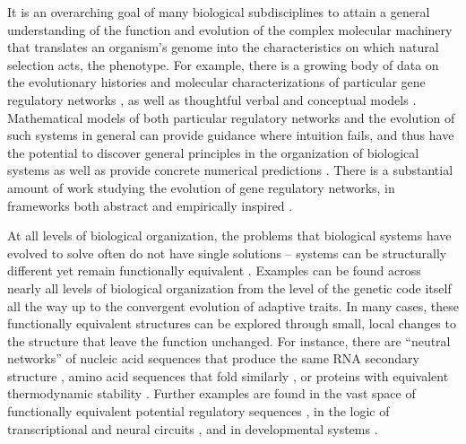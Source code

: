 \documentclass{article}
\newcommand{\plr}[1]{\todo[color=blue!25]{#1}}
\newcommand{\plr}[1]{{\color{blue}\it #1}}
\newcommand{\jss}[1]{{\color{olive}\it #1}}
\newcommand{\1}{\mathbbm{1}}
\begin{document}
It is an overarching goal of many biological subdisciplines 
to attain a general understanding of the function and evolution of the 
complex molecular machinery that translates an organism's genome 
into the characteristics on which natural selection acts,
the phenotype.
For example, 
there is a growing body of data on the evolutionary histories and molecular characterizations of particular gene regulatory networks
\citep{jaeger2011gap, davidson2006gene, israel2016comparative}, 
as well as thoughtful verbal and conceptual models \citep{true2001developmental, weiss2000phenogenetic, edelman2001degeneracy, pavlicev2012model}. 
Mathematical models of both particular regulatory networks
and the evolution of such systems in general
can provide guidance where intuition fails,
and thus have the potential to discover general principles in the organization of biological systems 
as well as provide concrete numerical predictions \citep{servedio2014not}.
There is a substantial amount of work studying the evolution of gene regulatory networks, in frameworks 
both abstract \citep{wagner1994evolution, wagner1996does, siegal2002waddington, bergman2003evolutionary, draghi2015robustness}
and empirically inspired
\citep{mjolsness1991connectionist, jaeger2004dynamic, vitaly1, crombach2016gap, wotton2015quantitative, chertkova2017insilico}.

At all levels of biological organization,
the problems that biological systems have evolved to solve
often do not have single solutions --
systems can be structurally different yet remain functionally equivalent \citep{edelman2001degeneracy}. 
Examples can be found across nearly all levels of biological organization from the level of the genetic code itself %
all the way up to the convergent evolution of adaptive traits.
In many cases, these functionally equivalent structures
can be explored through small, local changes to the structure that leave the function unchanged.
For instance, there are ``neutral networks''
of nucleic acid sequences that produce the same RNA secondary structure \citep{gruner1996analysis},
amino acid sequences that fold similarly \citep{babajide1997neutral},
or proteins with equivalent thermodynamic stability \citep{hart2014thermodynamic}.
Further examples are found in the vast space of functionally equivalent
potential regulatory sequences \citep{hare2008sepsid}, 
in the logic of transcriptional \citep{tsong2006evolution, matsui2015regulatory, dalal2016transcriptional, dalal2017transcription,jimenez2017spectrum} 
and neural circuits \citep{trojanowski2014neural}, and in developmental systems \citep{vondassow2000segment,true2001developmental}. 
 
\end{document}
